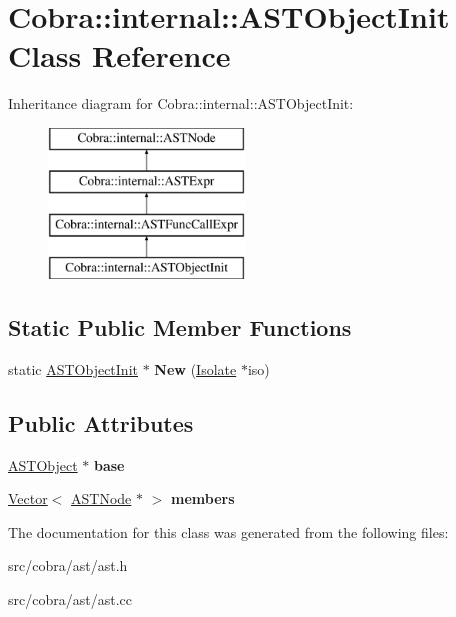\hypertarget{class_cobra_1_1internal_1_1_a_s_t_object_init}{\section{Cobra\+:\+:internal\+:\+:A\+S\+T\+Object\+Init Class Reference}
\label{class_cobra_1_1internal_1_1_a_s_t_object_init}
}
Inheritance diagram for Cobra\+:\+:internal\+:\+:A\+S\+T\+Object\+Init\+:\begin{figure}[H]
\begin{center}
\leavevmode
\includegraphics[height=4.000000cm]{class_cobra_1_1internal_1_1_a_s_t_object_init}
\end{center}
\end{figure}
\subsection*{Static Public Member Functions}
\begin{DoxyCompactItemize}
\item 
\hypertarget{class_cobra_1_1internal_1_1_a_s_t_object_init_afe176650f693f2f1619ddf0406149310}{static \hyperlink{class_cobra_1_1internal_1_1_a_s_t_object_init}{A\+S\+T\+Object\+Init} $\ast$ {\bfseries New} (\hyperlink{class_cobra_1_1internal_1_1_isolate}{Isolate} $\ast$iso)}\label{class_cobra_1_1internal_1_1_a_s_t_object_init_afe176650f693f2f1619ddf0406149310}

\end{DoxyCompactItemize}
\subsection*{Public Attributes}
\begin{DoxyCompactItemize}
\item 
\hypertarget{class_cobra_1_1internal_1_1_a_s_t_object_init_a7f3bcbfa984ca901b8e61cf2ba3f6bb0}{\hyperlink{class_cobra_1_1internal_1_1_a_s_t_object}{A\+S\+T\+Object} $\ast$ {\bfseries base}}\label{class_cobra_1_1internal_1_1_a_s_t_object_init_a7f3bcbfa984ca901b8e61cf2ba3f6bb0}

\item 
\hypertarget{class_cobra_1_1internal_1_1_a_s_t_object_init_abf68ebca928a760519233b76665b53ca}{\hyperlink{class_cobra_1_1internal_1_1_vector}{Vector}$<$ \hyperlink{class_cobra_1_1internal_1_1_a_s_t_node}{A\+S\+T\+Node} $\ast$ $>$ {\bfseries members}}\label{class_cobra_1_1internal_1_1_a_s_t_object_init_abf68ebca928a760519233b76665b53ca}

\end{DoxyCompactItemize}


The documentation for this class was generated from the following files\+:\begin{DoxyCompactItemize}
\item 
src/cobra/ast/ast.\+h\item 
src/cobra/ast/ast.\+cc\end{DoxyCompactItemize}
